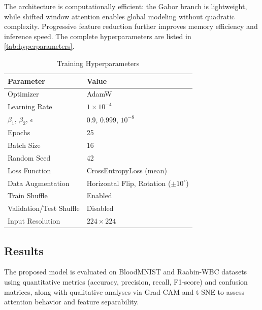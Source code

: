 \documentclass[preprint,12pt]{elsarticle}
\begin{document}
The architecture is computationally efficient: the Gabor branch is lightweight, while shifted window attention enables global modeling without quadratic complexity. Progressive feature reduction further improves memory efficiency and inference speed. The complete hyperparameters are listed in \autoref{tab:hyperparameters}.

\begin{table}[h]
\centering
\caption{Training Hyperparameters}
\label{tab:hyperparameters}
\footnotesize
\setlength{\tabcolsep}{4pt}
\renewcommand{\arraystretch}{1.1}

\begin{tabular}{|p{3.2cm}|p{4.2cm}|}
\hline
\textbf{Parameter} & \textbf{Value} \\ \hline

Optimizer & AdamW \\ \hline
Learning Rate & $1\times10^{-4}$ \\ \hline
$\beta_1$, $\beta_2$, $\epsilon$ & 0.9, 0.999, $10^{-8}$ \\ \hline

Epochs & 25 \\ \hline
Batch Size & 16 \\ \hline
Random Seed & 42 \\ \hline

Loss Function & CrossEntropyLoss (mean) \\ \hline

Data Augmentation & Horizontal Flip, Rotation ($\pm10^\circ$) \\ \hline
Train Shuffle & Enabled \\ \hline
Validation/Test Shuffle & Disabled \\ \hline

Input Resolution & $224 \times 224$ \\ \hline

\end{tabular}
\end{table}

\FloatBarrier
\subsection{Results}

The proposed model is evaluated on BloodMNIST and Raabin-WBC datasets using quantitative metrics (accuracy, precision, recall, F1-score) and confusion matrices, along with qualitative analyses via Grad-CAM and t-SNE to assess attention behavior and feature separability.
\end{document}
